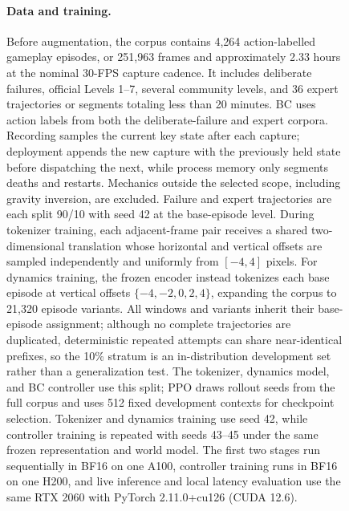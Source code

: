 \begin{figure}[!htbp]
\paragraph{Data and training.}
Before augmentation, the corpus contains 4,264 action-labelled gameplay episodes, or 251,963 frames and approximately 2.33 hours at the nominal 30-FPS capture cadence.
It includes deliberate failures, official Levels 1--7, several community levels, and 36 expert trajectories or segments totaling less than 20 minutes.
BC uses action labels from both the deliberate-failure and expert corpora.
Recording samples the current key state after each capture; deployment appends the new capture with the previously held state before dispatching the next, while process memory only segments deaths and restarts.
Mechanics outside the selected scope, including gravity inversion, are excluded.
Failure and expert trajectories are each split 90/10 with seed 42 at the base-episode level.
During tokenizer training, each adjacent-frame pair receives a shared two-dimensional translation whose horizontal and vertical offsets are sampled independently and uniformly from \([-4,4]\) pixels.
For dynamics training, the frozen encoder instead tokenizes each base episode at vertical offsets \(\{-4,-2,0,2,4\}\), expanding the corpus to 21,320 episode variants.
All windows and variants inherit their base-episode assignment; although no complete trajectories are duplicated, deterministic repeated attempts can share near-identical prefixes, so the 10\% stratum is an in-distribution development set rather than a generalization test.
The tokenizer, dynamics model, and BC controller use this split; PPO draws rollout seeds from the full corpus and uses 512 fixed development contexts for checkpoint selection.
Tokenizer and dynamics training use seed 42, while controller training is repeated with seeds 43--45 under the same frozen representation and world model.
The first two stages run sequentially in BF16 on one A100, controller training runs in BF16 on one H200, and live inference and local latency evaluation use the same RTX 2060 with PyTorch 2.11.0+cu126 (CUDA 12.6).


\end{figure}
